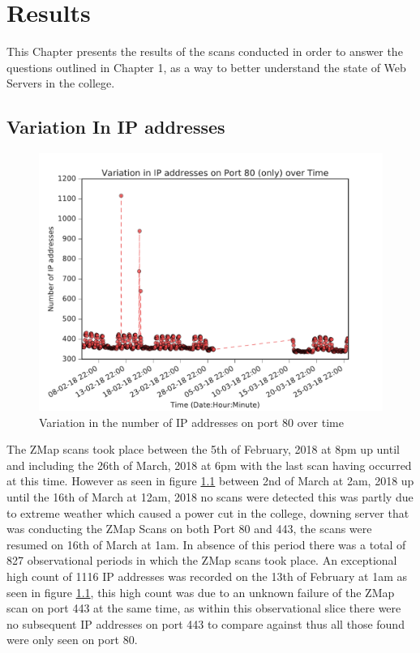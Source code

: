 \documentclass[a4wide,leqno,12pt]{report}
\begin{document}
\chapter{Results}
This Chapter presents the results of the scans conducted in order to answer the questions outlined in Chapter 1, as a way to better understand the state of Web Servers in the college.
\section{Variation In IP addresses}
\begin{figure}[H]
\centering
\includegraphics[scale=.5]{pdf_images/Ip_p80_alpha}
\caption{Variation in the number of IP addresses on port 80 over time}
\label{fig:port80ZMap}
\end{figure}

The ZMap scans took place between the 5th of February, 2018 at 8pm up until and including the 26th of March, 2018 at 6pm with the last scan having occurred at this time. However as seen in figure \ref{fig:port80ZMap} between
2nd of March at 2am, 2018  up until the 16th of March at 12am, 2018 no scans were detected this was partly due to extreme weather which caused a power cut in the college, downing server that was conducting the ZMap Scans on both Port 80 and 443, the scans were resumed on 16th of March at 1am. In absence of this period there was a total of 827 observational periods in which the ZMap scans took place. An exceptional high count of 1116 IP addresses was recorded on the 13th of February at 1am as seen in figure \ref{fig:port80ZMap}, this high count was due to an unknown failure of the ZMap scan on port 443 at the same time, as within this observational slice there were no subsequent IP addresses on port 443 to compare against thus all those found were only seen on port 80.\\
\end{document}
